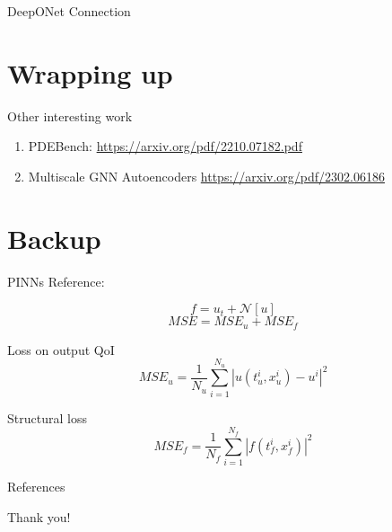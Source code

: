\documentclass[usenames,dvipsnames]{beamer}
\theoremstyle{definition}
\begin{document}
\begin{frame}{DeepONet Connection}
    
\end{frame}

\section{Wrapping up}
\begin{frame}{Other interesting work}
    \begin{enumerate}
        \item PDEBench: \url{https://arxiv.org/pdf/2210.07182.pdf}

        \item Multiscale GNN Autoencoders \url{https://arxiv.org/pdf/2302.06186}
    \end{enumerate}
\end{frame}

\section{Backup}
\begin{frame}{PINNs}
    Reference: \cite{Raissi2019}

    $$f = u_t+\mathcal{N}[u]$$
    $$MSE=MSE_u+MSE_f$$

    Loss on output QoI
    $$MSE_u=\frac{1}{N_u}\sum_{i=1}^{N_u}|u(t_u^i,x_u^i)-u^i|^2$$

    Structural loss
    $$MSE_f=\frac{1}{N_f}\sum_{i=1}^{N_f}|f(t_f^i,x_f^i)|^2$$
\end{frame}

\begin{frame}{References}


%

    
\end{frame}



\begin{frame}{}
\begin{center}
    \Large{Thank you!}
\end{center}
    
\end{frame}
\end{document}
